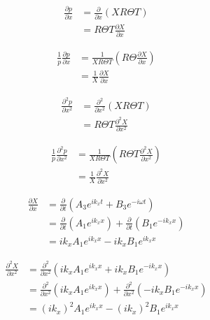 \documentclass[a4paper]{report}
\begin{document}
\begin{align*}
    \frac{\partial p}{\partial x} 
    &=
    \frac{\partial }{\partial x}  \left( XR\Theta T \right) \\
    &=
    R\Theta T \frac{\partial X}{\partial x}  
\end{align*}


\begin{align*}
    \frac{1}{p}\frac{\partial p}{\partial x} 
    &=
    \frac{ 1}{X R \Theta T}  \left( R\Theta\frac{\partial X}{\partial x} \right) \\
    &=\frac{ 1}{ X}\frac{\partial X}{\partial x}  
\end{align*}

\begin{align*}
    \frac{\partial^2 p}{\partial x^2} 
    &=
    \frac{\partial^2 }{\partial x^2}  \left( XR\Theta T \right) \\
    &=
    R\Theta T \frac{\partial^2 X}{\partial x^2}  
\end{align*}


\begin{align*}
    \frac{1}{p}\frac{\partial^2 p}{\partial x^2} 
    &=
    \frac{ 1}{X R \Theta T}  \left( R\Theta T \frac{\partial^2 X}{\partial x^2} \right) \\
    &=\frac{ 1}{ X}\frac{\partial^2 X}{\partial x^2}  
\end{align*}

\begin{align*}
    \frac{\partial X}{\partial x} &=
    \frac{\partial}{\partial t}
        \left( 
        A_3 e^{i k_x t} + B_3 e^{-i \omega t}
    \right)  \\
    &=
    \frac{\partial}{\partial t} \left(A_1 e^{i k_x x}  \right) +
    \frac{\partial}{\partial t} \left(B_1 e^{-i k_x x }  \right)\\ 
    &= i k_x A_1 e^{i k_x x } - i k_x B_1 e^{i k_x x} 
\end{align*}

\begin{align*}
    \frac{\partial^2 X}{\partial x^2} &=
    \frac{\partial^2}{\partial x^2}
        \left( 
        i k_x A_1 e^{i k_x x} + i k_x B_1 e^{-i k_x x}
    \right)  \\
    &=
    \frac{\partial^2}{\partial x^2} \left(i k_x A_1 e^{i k_x x}  \right) +
    \frac{\partial^2}{\partial x^2} \left(- i k_x B_1 e^{-i k_x x}  \right)\\ 
    &= (i k_x)^2 A_1 e^{i k_x x} - (i k_x)^2 B_1 e^{i k_x x} 
\end{align*}
\end{document}
